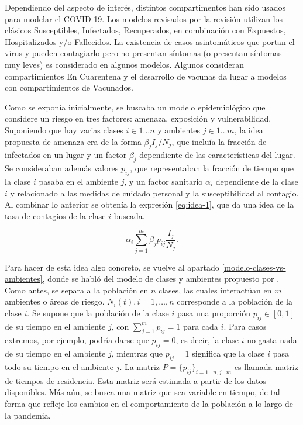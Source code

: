 
Dependiendo del aspecto de interés, distintos compartimentos han sido usados para modelar el COVID-19. Los modelos revisados por la revisión \cite{Xiang2021} utilizan los clásicos Susceptibles, Infectados, Recuperados, en combinación con Expuestos, Hospitalizados y/o Fallecidos. La existencia de casos asintomáticos que portan el virus y pueden contagiarlo pero no presentan síntomas (o presentan síntomas muy leves) es considerado en algunos modelos. Algunos consideran compartimientos En Cuarentena y el desarrollo de vacunas da lugar a modelos con compartimientos de Vacunados.

Como se exponía inicialmente, se buscaba un modelo epidemiológico que considere un riesgo en tres factores: amenaza, exposición y vulnerabilidad. Suponiendo que hay varias clases \(i \in 1 \dots n\) y ambientes \(j \in 1 \dots m\), la idea propuesta de amenaza era de la forma \(\beta_j I_j/N_j\), que incluía la fracción de infectados en un lugar y un factor \(\beta_j\) dependiente de las características del lugar. Se consideraban además valores \(p_{ij}\), que representaban la fracción de tiempo que la clase \(i\) pasaba en el ambiente \(j\), y un factor sanitario \(\alpha_i\) dependiente de la clase \(i\) y relacionado a las medidas de cuidado personal y la susceptibilidad al contagio. Al combinar lo anterior se obtenía la expresión \ref{eq:idea-1}, que da una idea de la tasa de contagios de la clase \(i\) buscada.

\begin{equation}\label{eq:idea-1}
\alpha_i \sum_{j = 1}^m \beta_j p_{ij} \frac{I_j}{N_j}.
\end{equation}

Para hacer de esta idea algo concreto, se vuelve al apartado \ref{modelo-clases-vs-ambientes}, donde se habló del modelo de clases y ambientes propuesto por \cite{Bichara2015}\cite{Bichara2018}. Como antes, se separa a la población en \(n\) clases, las cuales interactúan en \(m\) ambientes o áreas de riesgo. \(N_i(t), i = 1, \dots, n\) corresponde a la población de la clase \(i\). Se supone que la población de la clase \(i\) pasa una proporción \(p_{ij} \in [0,1]\) de su tiempo en el ambiente \(j\), con \(\sum_{j = 1}^{m} p_{ij} = 1\) para cada \(i\). Para casos extremos, por ejemplo, podría darse que \(p_{ij} = 0\), es decir, la clase \(i\) no gasta nada de su tiempo en el ambiente \(j\), mientras que \(p_{ij} = 1\) significa que la clase \(i\) pasa todo su tiempo en el ambiente \(j\). La matriz \(P = \{p_{ij}\}_{i = 1\dots n,j \dots m}\) es llamada matriz de tiempos de residencia. Esta matriz será estimada a partir de los datos disponibles. Más aún, se busca una matriz que sea variable en tiempo, de tal forma que refleje los cambios en el comportamiento de la población a lo largo de la pandemia.


